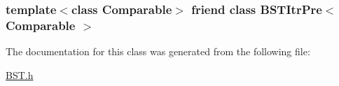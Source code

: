 \hypertarget{class_b_s_t_a45a55df6f11541416d4ea7684c575c1a}{
\subsubsection[{B\-S\-T\-Itr\-Pre$<$ Comparable $>$}]{\setlength{\rightskip}{0pt plus 5cm}template$<$class Comparable$>$ friend class {\bf B\-S\-T\-Itr\-Pre}$<$ Comparable $>$\hspace{0.3cm}{\ttfamily [friend]}}}\label{class_b_s_t_a45a55df6f11541416d4ea7684c575c1a}


The documentation for this class was generated from the following file\-:\begin{DoxyCompactItemize}
\item 
\hyperlink{_b_s_t_8h}{B\-S\-T.\-h}\end{DoxyCompactItemize}

